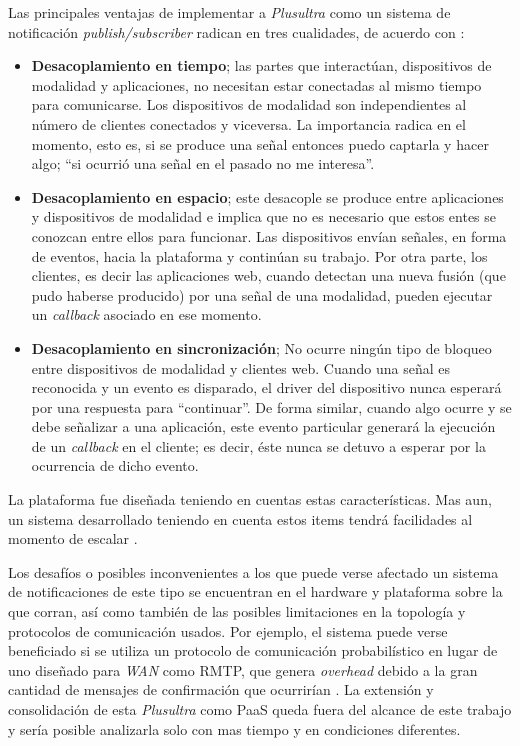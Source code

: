 Las principales ventajas de implementar a \emph{Plusultra} como un sistema de notificación \emph{publish/subscriber} radican en tres cualidades, de acuerdo con \citet{Kermarrec2003}:
\begin{itemize}
\item \textbf{Desacoplamiento en tiempo}; las partes que interactúan, dispositivos de modalidad y aplicaciones, no necesitan estar conectadas al mismo tiempo para comunicarse. Los dispositivos de modalidad son independientes al número de clientes conectados y viceversa. La importancia radica en el momento, esto es, si se produce una señal entonces puedo captarla y hacer algo; ``si ocurrió una señal en el pasado no me interesa''.

\item \textbf{Desacoplamiento en espacio}; este desacople se produce entre aplicaciones y dispositivos de modalidad e implica que no es necesario que estos entes se conozcan entre ellos para funcionar. Las dispositivos envían señales, en forma de eventos, hacia la plataforma y continúan su trabajo. Por otra parte, los clientes, es decir las aplicaciones web, cuando detectan una nueva fusión (que pudo haberse producido) por una señal de una modalidad, pueden ejecutar un \emph{callback} asociado en ese momento. 

\item \textbf{Desacoplamiento en sincronización}; No ocurre ningún tipo de bloqueo entre dispositivos de modalidad y clientes web. Cuando una señal es reconocida y un evento es disparado, el driver del dispositivo nunca esperará por una respuesta para ``continuar''. De forma similar, cuando algo ocurre y se debe señalizar a una aplicación, este evento particular generará la ejecución de un \emph{callback} en el cliente; es decir, éste nunca se detuvo a esperar por la ocurrencia de dicho evento.

\end{itemize}

La plataforma fue diseñada teniendo en cuentas estas características. Mas aun, un sistema desarrollado teniendo en cuenta estos items tendrá facilidades al momento de escalar \citep{Kermarrec2003}.

Los desafíos o posibles inconvenientes a los que puede verse afectado un sistema de notificaciones de este tipo se encuentran en el hardware y plataforma sobre la que corran, así como también de las posibles limitaciones en la topología y protocolos de comunicación usados. Por ejemplo, el sistema puede verse beneficiado si se utiliza un protocolo de comunicación probabilístico en lugar de uno diseñado para \emph{WAN} como RMTP, que genera \emph{overhead} debido a la gran cantidad de mensajes de confirmación que ocurrirían \citep{Kermarrec2003}.
La extensión y consolidación de esta \emph{Plusultra} como PaaS queda fuera del alcance de este trabajo y sería posible analizarla solo con mas tiempo y en condiciones diferentes.

